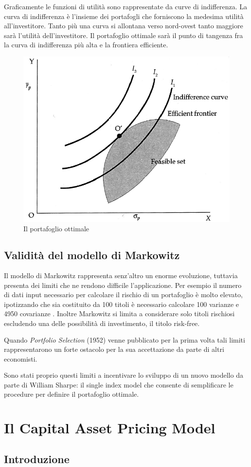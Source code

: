Graficamente le funzioni di utilità sono rappresentate da curve di indifferenza. La curva di indifferenza è l'insieme dei portafogli che forniscono la medesima utilità all'investitore. Tanto più una curva si allontana verso nord-ovest tanto maggiore sarà l'utilità dell'investitore. Il portafoglio ottimale sarà il punto di tangenza fra la curva di indifferenza più alta e la frontiera efficiente. 
\begin{figure} [h!]
	\centering
	\includegraphics[width=0.4\linewidth]{"imgs/indiff curve"}
	\caption{Il portafoglio ottimale \cite{noauthor_optimum_nodate}}
	\label{fig:indiff-curve}
\end{figure}
\subsection{Validità del modello di Markowitz}
Il modello di Markowitz rappresenta senz'altro un enorme evoluzione, tuttavia presenta dei limiti che ne rendono difficile l'applicazione.  Per esempio il numero di dati input necessario per calcolare il rischio di un portafoglio è molto elevato, ipotizzando che sia costituito da 100 titoli è necessario calcolare 100 varianze e 4950 covarianze \cite{kritzman_what_1991}. Inoltre Markowitz si limita a considerare solo titoli rischiosi escludendo una delle possibilità di investimento, il titolo risk-free. 

Quando \textit{Portfolio Selection} (1952) venne pubblicato per la prima volta tali limiti rappresentarono un forte ostacolo per la sua accettazione da parte di altri economisti.

Sono stati proprio questi limiti a incentivare lo sviluppo di un nuovo modello da parte di William Sharpe: il single index model che consente di semplificare le procedure per definire il portafoglio ottimale. 

\section{Il Capital Asset Pricing Model}
\subsection{Introduzione}

